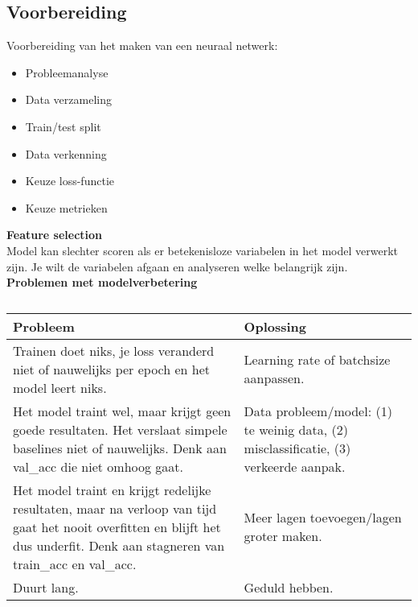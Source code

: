 {\subsection{Voorbereiding}
Voorbereiding van het maken van een neuraal netwerk:
\begin{itemize}
    \item Probleemanalyse
    \item Data verzameling
    \item Train/test split
    \item Data verkenning
    \item Keuze loss-functie
    \item Keuze metrieken
\end{itemize}
\textbf{Feature selection}\\
Model kan slechter scoren als er betekenisloze variabelen in het model verwerkt zijn. Je wilt de variabelen afgaan en analyseren welke belangrijk zijn.\\

\textbf{Problemen met modelverbetering}
\begin{table}[h]
    \centering
    \begin{tabular}{|p{6cm}|p{5cm}|}
    \hline
    \textbf{Probleem} & \textbf{Oplossing}\\ \hline
         Trainen doet niks, je loss veranderd niet of nauwelijks per epoch en het model leert niks. & Learning rate of batchsize aanpassen. \\ \hline
         Het model traint wel, maar krijgt geen goede resultaten. Het verslaat simpele baselines niet of nauwelijks. Denk aan val\_acc die niet omhoog gaat. & Data probleem/model: (1) te weinig data, (2) misclassificatie, (3) verkeerde aanpak.\\\hline
         Het model traint en krijgt redelijke resultaten, maar na verloop van tijd gaat het nooit overfitten en blijft het dus underfit. Denk aan stagneren van train\_acc en val\_acc. & Meer lagen toevoegen/lagen groter maken.\\ \hline
         Duurt lang. & Geduld hebben. \\ \hline
    \end{tabular}
    \caption*{}
    \label{tab:my_label}
\end{table}


}
